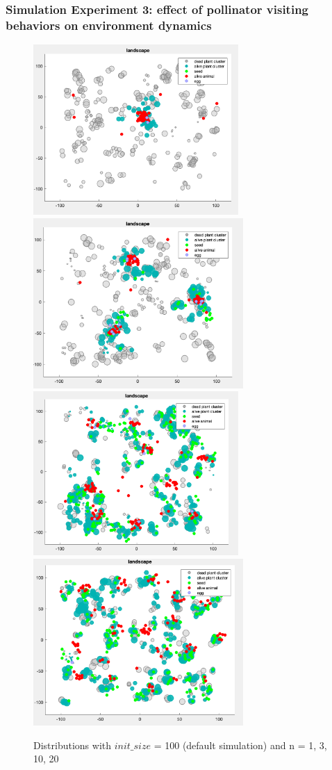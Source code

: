 \documentclass[3p,,preprint,12pt]{elsarticle}
\begin{document}
\subsubsection{Simulation Experiment 3: effect of pollinator visiting behaviors on environment dynamics}

    \begin{figure}[!htb]
    \begin{center}
    \includegraphics[width=78mm]{figures/s3_1.png} 
    \includegraphics[width=80mm]{figures/s3_2.png} 
    \includegraphics[width=78mm]{figures/s3_3.png}
    \includegraphics[width=80mm]{figures/s3_4.png}
    \caption{Distributions with $init\_size$ = 100 (default simulation) and n = 1, 3, 10, 20}
    \end{center}
    \end{figure}
\end{document}
